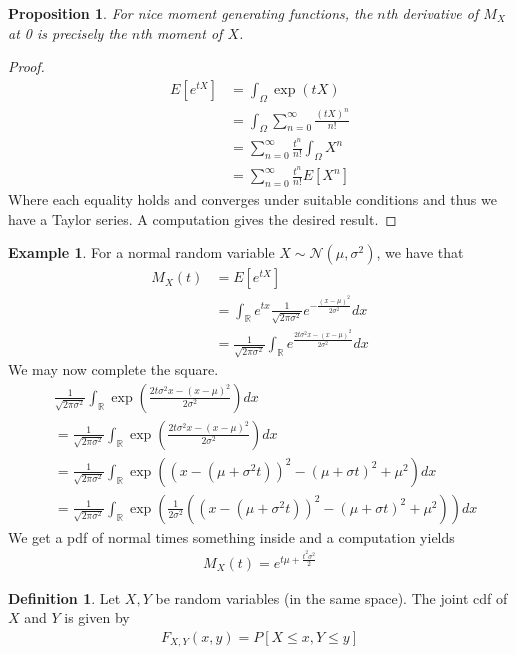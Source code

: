 \documentclass[11pt]{amsart}
\newtheorem{proposition}[theorem]{Proposition}
\theoremstyle{definition}
\newtheorem{definition}[theorem]{Definition}
\newtheorem{example}[theorem]{Example}
\numberwithin{equation}{section}
\begin{document}
\begin{proposition}
    For nice moment generating functions, the $n$th derivative of $M_X$ at 0 is precisely the $n$th moment of $X$.
\end{proposition}
\begin{proof}
    \begin{align*}
        E[e^{tX}]&=\int_\Omega\exp(tX)\\
        &=\int_\Omega\sum_{n=0}^\infty\frac{(tX)^n}{n!}\\
        &=\sum_{n=0}^\infty\frac{t^n}{n!}\int_\Omega X^n\\
        &=\sum_{n=0}^\infty\frac{t^n}{n!}E[X^n]
    \end{align*}
    Where each equality holds and converges under suitable conditions and thus we have a Taylor series. A computation gives the desired result.
\end{proof}
\begin{example}
    For a normal random variable $X\sim\mathcal N(\mu,\sigma^2)$, we have that
    \begin{align*}
        M_X(t)&=E[e^{tX}]\\
        &=\int_\mathbb R e^{tx}\frac{1}{\sqrt{2\pi\sigma^2}}e^{-\frac{(x-\mu)^2}{2\sigma^2}}dx\\
        &=\frac{1}{\sqrt{2\pi\sigma^2}}\int_\mathbb Re^{\frac{2t\sigma^2x-(x-\mu)^2}{2\sigma^2}}dx
    \end{align*}
    We may now complete the square.
    \begin{align*}
        &\frac{1}{\sqrt{2\pi\sigma^2}}\int_\mathbb R\exp\left({\frac{2t\sigma^2x-(x-\mu)^2}{2\sigma^2}}\right)dx\\
        &=\frac{1}{\sqrt{2\pi\sigma^2}}\int_\mathbb R\exp\left({\frac{2t\sigma^2x-(x-\mu)^2}{2\sigma^2}}\right)dx\\
        &=\frac{1}{\sqrt{2\pi\sigma^2}}\int_\mathbb R\exp\left((x-(\mu+\sigma^2t))^2-(\mu+\sigma t)^2+\mu^2\right)dx\\
        &=\frac{1}{\sqrt{2\pi\sigma^2}}\int_\mathbb R\exp\left(\frac{1}{2\sigma^2}\left((x-(\mu+\sigma^2t))^2-(\mu+\sigma t)^2+\mu^2\right)\right)dx
    \end{align*}
    We get a pdf of normal times something inside and a computation yields
    \begin{align*}
        M_X(t)=e^{t\mu+\frac{t^2\sigma^2}{2}}
    \end{align*}
\end{example}
\begin{definition}
    Let $X,Y$ be random variables (in the same space). The joint cdf of $X$ and $Y$ is given by
    \begin{align*}
        F_{X,Y}(x,y)=P[X\le x,Y\le y]
    \end{align*}
\end{definition}
\end{document}
